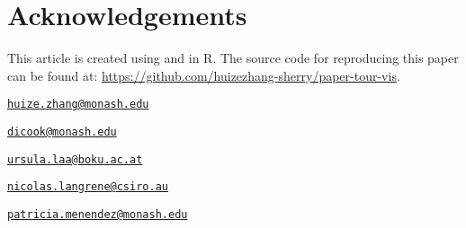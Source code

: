 \hypertarget{acknowledgements}{%
\section{Acknowledgements}\label{acknowledgements}}

This article is created using  \citep{knitr} and
 \citep{rmarkdown} in R. The source code for
reproducing this paper can be found at:
\url{https://github.com/huizezhang-sherry/paper-tour-vis}.




\address{%
H.Sherry Zhang\\
Monash University\\
Department of Econometrics and Business Statistics\\
}
\href{mailto:huize.zhang@monash.edu}{\nolinkurl{huize.zhang@monash.edu}}

\address{%
Dianne Cook\\
Monash University\\
Department of Econometrics and Business Statistics\\
}
\href{mailto:dicook@monash.edu}{\nolinkurl{dicook@monash.edu}}

\address{%
Ursula Laa\\
University of Natural Resources and Life Sciences\\
Institute of Statistics\\
}
\href{mailto:ursula.laa@boku.ac.at}{\nolinkurl{ursula.laa@boku.ac.at}}

\address{%
Nicolas Langrené\\
CSIRO Data61\\
34 Village Street, Docklands VIC 3008 Australia\\
}
\href{mailto:nicolas.langrene@csiro.au}{\nolinkurl{nicolas.langrene@csiro.au}}

\address{%
Patricia Menéndez\\
Monash University\\
Department of Econometrics and Business Statistics\\
}
\href{mailto:patricia.menendez@monash.edu}{\nolinkurl{patricia.menendez@monash.edu}}

